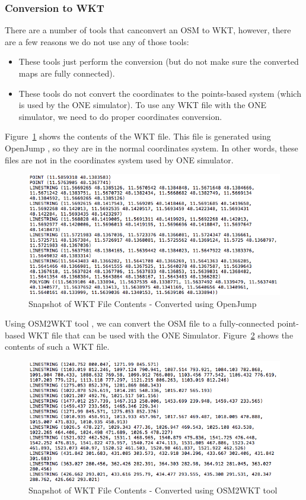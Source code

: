 	\subsubsection{Conversion to WKT}
	There are a number of tools that canconvert an OSM to WKT, however, there are a few reasons we do not use any of those tools:
	\begin{itemize}
 	 \item These tools just perform the conversion (but do not make sure the converted maps are fully connected).
   	 \item These tools do not convert the coordinates to the points-based system (which is used by the ONE simulator). To use any WKT file with the ONE simulator, we need to do proper coordinates conversion.
	\end{itemize}
	\vspace{3mm}
	Figure~\ref{fig:wkt-file} shows the contents of the WKT file. This file is generated using OpenJump \cite{openjump}, so they are in the normal coordinates system. In other words, these files are not in the coordinates system used by ONE simulator.
	\vspace{2mm}
	\begin{figure}[H]
		\centering
		\includegraphics[scale=0.55]{./figures/wkt-file-2}
		\caption{Snapshot of WKT File Contents - Converted using OpenJump \cite{openjump} }
		\label{fig:wkt-file}
	\end{figure}
	Using OSM2WKT tool \cite{mayer2010osm}, we can convert the OSM file to a fully-connected point-based WKT file that can be used with the ONE Simulator. Figure~\ref{fig:wkt-file-for-one} shows the contents of such a WKT file.
	\vspace{2mm}
	\begin{figure}[H]
		\centering
		\includegraphics[scale=0.55]{./figures/wkt-file-1}
		\caption{Snapshot of WKT File Contents - Converted using OSM2WKT tool \cite{mayer2010osm} }
		\label{fig:wkt-file-for-one}
	\end{figure}

